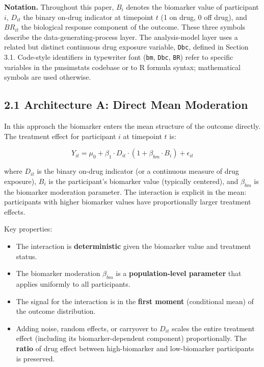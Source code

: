 \documentclass[
  11pt,
]{article}
\begin{document}
\textbf{Notation.} Throughout this paper, \(B_i\) denotes the biomarker
value of participant \(i\), \(D_{it}\) the binary on-drug indicator at
timepoint \(t\) (1 on drug, 0 off drug), and \(BR_{it}\) the biological
response component of the outcome. These three symbols describe the
data-generating-process layer. The analysis-model layer uses a related
but distinct continuous drug exposure variable, \texttt{Dbc}, defined in
Section 3.1. Code-style identifiers in typewriter font (\texttt{bm},
\texttt{Dbc}, \texttt{BR}) refer to specific variables in the pmsimstats
codebase or to R formula syntax; mathematical symbols are used
otherwise.

\subsection{2.1 Architecture A: Direct Mean Moderation}

In this approach the biomarker enters the mean structure of the outcome
directly. The treatment effect for participant \(i\) at timepoint \(t\)
is:

\[Y_{it} = \mu_0 + \beta_1 \cdot D_{it} \cdot (1 + \beta_{bm}
\cdot B_i) + \epsilon_{it}\]

where \(D_{it}\) is the binary on-drug indicator (or a continuous
measure of drug exposure), \(B_i\) is the participant's biomarker value
(typically centered), and \(\beta_{bm}\) is the biomarker moderation
parameter. The interaction is explicit in the mean: participants with
higher biomarker values have proportionally larger treatment effects.

Key properties:

\begin{itemize}
\item The interaction is \textbf{deterministic} given the biomarker value
  and treatment status.
\item The biomarker moderation $\beta_{bm}$ is a \textbf{population-level
  parameter} that applies uniformly to all participants.
\item The signal for the interaction is in the \textbf{first moment}
  (conditional mean) of the outcome distribution.
\item Adding noise, random effects, or carryover to $D_{it}$ scales
  the entire treatment effect (including its biomarker-dependent
  component) proportionally. The \textbf{ratio} of drug effect between
  high-biomarker and low-biomarker participants is preserved.
\end{itemize}
\end{document}
